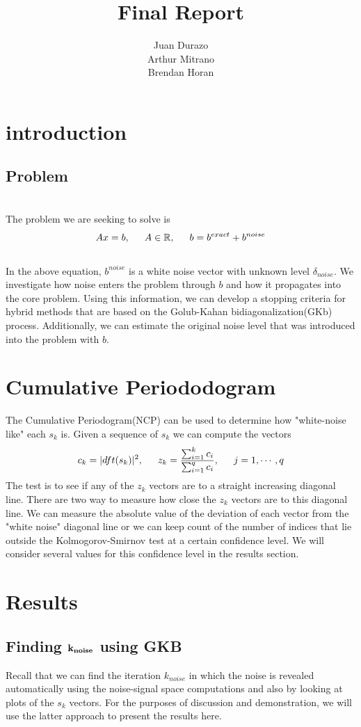 \documentclass[11pt]{amsart}
\title{Final Report}
\author{Juan Durazo \\ Arthur Mitrano \\ Brendan Horan}
\begin{document}
\maketitle
\section{ introduction}
\subsection{Problem} \indent \\
The problem we are seeking to solve is 
$$Ax=b, \indent A  \in  \mathbb{R}, \indent b = b^{exact} + b^{noise}$$ \\
In the above equation, $b^{noise}$ is a white noise vector with unknown level $\delta_{noise}$.
We investigate how noise enters the problem through $b$ and how it propagates into the 
core problem. Using this information, we can develop a stopping criteria for hybrid methods 
that are based on the Golub-Kahan bidiagonalization(GKb) process. Additionally, we 
can estimate the original noise level that was introduced into the problem with $b$.

\section{Cumulative Periododogram}
The Cumulative Periodogram(NCP) can be used to determine how "white-noise like" 
each $s_k$ is. Given a sequence of $s_k$ we can compute the vectors
$$c_k = |dft(s_k)|^2, \indent z_k = \frac{\sum_{i=1}^k c_i}{ \sum_{i=1}^q c_i}, \indent j=1,\cdots, q$$ 
The test is to see if any of the $z_k$ vectors are to a straight increasing diagonal line. There are two 
way to measure how close the $z_k$ vectors are to this diagonal line. We can measure the 
absolute value of the deviation of each vector from the "white noise" diagonal line or we can keep
count of the number of indices that lie outside the Kolmogorov-Smirnov test at a certain confidence 
level. We will consider several values for this confidence level in the results section.

\section{Results}

\subsection{Finding $\bf k_{noise}$ using GKB}
	Recall that we can find the iteration $k_{noise}$ in which the noise is revealed automatically
	using the noise-signal space computations and also by looking at plots of the $s_k$ vectors.
	For the purposes of discussion and demonstration, we will use the latter approach to present
	the results here.
\end{document}
